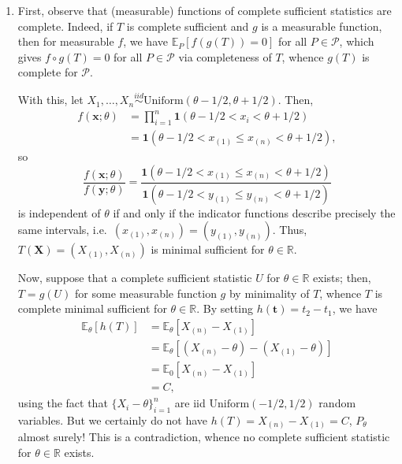 \documentclass[11pt]{article}
\newcommand{\R}{\mathbb{R}}
\begin{document}
\begin{enumerate}
\begin{enumerate}
        \item First, observe that (measurable) functions of complete
        sufficient statistics are complete.  Indeed, if $T$ is complete
        sufficient and $g$ is a measurable function, then for measurable $f$,
        we have $\mathbb{E}_P[f(g(T)) = 0]$ for all $P \in \mathcal{P}$, which
        gives $f\circ g(T) = 0$ for all $P \in \mathcal{P}$ via completeness
        of $T$, whence $g(T)$ is complete for $\mathcal{P}$.


        With this, let $X_1, \dots, X_n \overset{iid}{\sim}
        \text{Uniform}(\theta - 1/2, \theta + 1/2)$.
        Then, \begin{align*}
            f(\bm{x}; \theta)
                &= \prod_{i = 1}^n \bm{1}(\theta - 1/2 < x_i < \theta + 1/2) \\
                &= \bm{1}(\theta - 1/2 < x_{(1)} \leq x_{(n)} < \theta + 1/2),
        \end{align*}
        so \[
            \frac{f(\bm{x}; \theta)}{f(\bm{y}; \theta)} = \frac{\bm{1}(\theta - 1/2 < x_{(1)} \leq x_{(n)} < \theta + 1/2)}{\bm{1}(\theta - 1/2 < y_{(1)} \leq y_{(n)} < \theta + 1/2)}
        \] is independent of $\theta$ if and only if the indicator functions
        describe precisely the same intervals, i.e.\ $(x_{(1)}, x_{(n)}) =
        (y_{(1)}, y_{(n)})$.
        Thus, $T(\bm{X}) = (X_{(1)}, X_{(n)})$ is minimal sufficient for
        $\theta \in \R$.

        Now, suppose that a complete sufficient statistic $U$ for $\theta \in \R$
        exists; then, $T = g(U)$ for some measurable function $g$ by
        minimality of $T$, whence $T$ is complete minimal sufficient for
        $\theta \in \R$.
        By setting $h(\bm{t}) = t_2 - t_1$, we have
        \begin{align*}
            \mathbb{E}_\theta[h(T)] 
                &= \mathbb{E}_\theta[X_{(n)} - X_{(1)}] \\
                &= \mathbb{E}_\theta[(X_{(n)} - \theta) - (X_{(1)} - \theta)] \\
                &= \mathbb{E}_0[X_{(n)} - X_{(1)}] \\
                &= C, \tag{$= (n - 1) / (n + 1)$}
        \end{align*}
        using the fact that $\{X_i - \theta\}_{i = 1}^n$ are iid
        $\text{Uniform}(-1/2, 1/2)$ random variables.
        But we certainly do not have $h(T) = X_{(n)} - X_{(1)} = C$,
        $P_\theta$ almost surely!
        This is a contradiction, whence no complete sufficient statistic for
        $\theta \in \R$ exists.
    \end{enumerate}



\end{enumerate}
\end{document}
